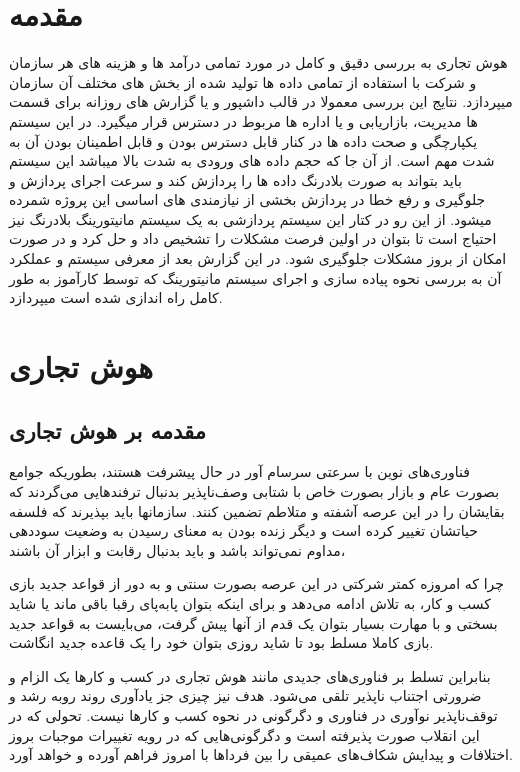 \documentclass{llncs}
\begin{document}
\section{مقدمه}
هوش تجاری به بررسی دقیق و کامل در مورد تمامی درآمد ها و هزینه های هر سازمان و شرکت با استفاده از تمامی داده ها تولید شده از بخش های مختلف آن سازمان میپردازد.
نتایج این بررسی معمولا در قالب داشپور و یا گزارش های روزانه برای قسمت ها مدیریت، بازاریابی و یا اداره ها مربوط در دسترس قرار میگیرد.
در این سیستم یکپارچگی و صحت داده ها در کنار قابل دسترس بودن و قابل اطمینان بودن آن به شدت مهم است.
از آن جا که حجم داده های ورودی به شدت بالا میباشد این سیستم باید بتواند به صورت بلادرنگ داده ها را پردازش کند و سرعت اجرای پردازش و جلوگیری و رفع خطا در پردازش بخشی از نیازمندی های اساسی این پروژه شمرده میشود.
از این رو در کتار این سیستم پردازشی به یک سیستم مانیتورینگ بلادرنگ نیز احتیاج است تا بتوان در اولین فرصت مشکلات را تشخیص داد و حل کرد و در صورت امکان از بروز مشکلات جلوگیری شود.
در این گزارش بعد از معرفی سیستم و عملکرد آن به بررسی نحوه پیاده سازی و اجرای سیستم مانیتورینگ که توسط کارآموز به طور کامل راه اندازی شده است میپردازد.
\newpage
\section {هوش تجاری}
\subsection{مقدمه بر هوش تجاری}
فناوری‌های نوین با سرعتی سرسام آور در حال پیشرفت هستند، بطوریکه جوامع بصورت عام و بازار بصورت خاص با شتابی وصف‌ناپذیر بدنبال ترفندهایی می‌گردند که بقایشان را در این عرصه آشفته و متلاطم تضمین کنند. سازمانها باید بپذیرند که فلسفه حیاتشان تغییر کرده است و دیگر زنده بودن به معنای رسیدن به وضعیت سوددهی مداوم نمی‌تواند باشد و باید بدنبال رقابت و ابزار آن باشند،

چرا که امروزه کمتر شرکتی در این عرصه بصورت سنتی و به دور از قواعد جدید بازی کسب و کار، به تلاش ادامه می‌دهد و برای اینکه بتوان پابه‌پای رقبا باقی ماند یا شاید بسختی و با مهارت بسیار بتوان یک قدم از آنها پیش گرفت، می‌بایست به قواعد جدید بازی کاملا مسلط بود تا شاید روزی بتوان خود را یک قاعده جدید انگاشت.

بنابراین تسلط بر فناوری‌های جدیدی مانند هوش تجاری در کسب و کارها یک الزام و ضرورتی اجتناب ناپذیر تلقی می‌شود. هدف نیز چیزی جز یادآوری روند روبه رشد و توقف‌ناپذیر نوآوری در فناوری و دگرگونی در نحوه کسب و کارها نیست. تحولی که در این انقلاب صورت پذیرفته است و دگرگونی‌هایی که در رویه تغییرات موجبات بروز اختلافات و پیدایش شکاف‌های عمیقی را بین فرداها با امروز فراهم آورده و خواهد آورد.
\end{document}
